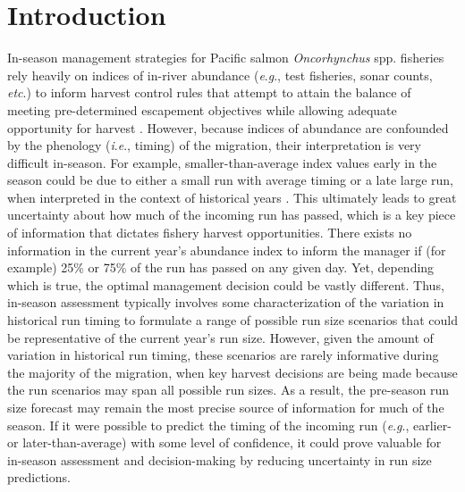 \documentclass[12pt,]{book}
\theoremstyle{definition}
\theoremstyle{definition}
\theoremstyle{definition}
\theoremstyle{remark}
\begin{document}
\section{Introduction}\label{introduction}

\noindent
In-season management strategies for Pacific salmon \emph{Oncorhynchus}
spp. fisheries rely heavily on indices of in-river abundance
(\emph{e}.\emph{g}., test fisheries, sonar counts, \emph{etc}.) to
inform harvest control rules that attempt to attain the balance of
meeting pre-determined escapement objectives while allowing adequate
opportunity for harvest \citep{catalano-jones-2014}. However, because
indices of abundance are confounded by the phenology
(\emph{i}.\emph{e}., timing) of the migration, their interpretation is
very difficult in-season. For example, smaller-than-average index values
early in the season could be due to either a small run with average
timing or a late large run, when interpreted in the context of
historical years \citep{adkison-cunningham-2015}. This ultimately leads
to great uncertainty about how much of the incoming run has passed,
which is a key piece of information that dictates fishery harvest
opportunities. There exists no information in the current year's
abundance index to inform the manager if (for example) 25\% or 75\% of
the run has passed on any given day. Yet, depending which is true, the
optimal management decision could be vastly different. Thus, in-season
assessment typically involves some characterization of the variation in
historical run timing to formulate a range of possible run size
scenarios that could be representative of the current year's run size.
However, given the amount of variation in historical run timing, these
scenarios are rarely informative during the majority of the migration,
when key harvest decisions are being made because the run scenarios may
span all possible run sizes. As a result, the pre-season run size
forecast may remain the most precise source of information for much of
the season. If it were possible to predict the timing of the incoming
run (\emph{e}.\emph{g}., earlier- or later-than-average) with some level
of confidence, it could prove valuable for in-season assessment and
decision-making by reducing uncertainty in run size predictions.
\end{document}
